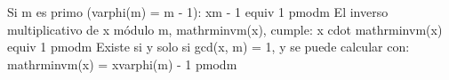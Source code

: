 {}Si \markdownRendererDollarSign{}m\markdownRendererDollarSign{} es primo (\markdownRendererDollarSign{}\markdownRendererBackslash{}varphi(m) = m - 1\markdownRendererDollarSign{}):\markdownRendererInterblockSeparator
{}
\markdownRendererSectionEnd \markdownRendererSectionBegin
{}\markdownRendererInterblockSeparator
{}\markdownRendererDollarSign{}\markdownRendererDollarSign{}\markdownRendererSoftLineBreak
{}x\markdownRendererCircumflex{}\markdownRendererLeftBrace{}m - 1\markdownRendererRightBrace{} \markdownRendererBackslash{}equiv 1 \markdownRendererBackslash{}pmod\markdownRendererLeftBrace{}m\markdownRendererRightBrace{}\markdownRendererSoftLineBreak
{}\markdownRendererDollarSign{}\markdownRendererDollarSign{}\markdownRendererParagraphSeparator
{}
\markdownRendererSectionEnd 
\markdownRendererSectionEnd \markdownRendererSectionBegin
{}\markdownRendererInterblockSeparator
{}El inverso multiplicativo de \markdownRendererDollarSign{}x\markdownRendererDollarSign{} módulo \markdownRendererDollarSign{}m\markdownRendererDollarSign{}, \markdownRendererDollarSign{}\markdownRendererBackslash{}mathrm\markdownRendererLeftBrace{}inv\markdownRendererRightBrace{}\markdownRendererUnderscore{}m(x)\markdownRendererDollarSign{}, cumple:\markdownRendererParagraphSeparator
{}\markdownRendererDollarSign{}\markdownRendererDollarSign{}\markdownRendererSoftLineBreak
{}x \markdownRendererBackslash{}cdot \markdownRendererBackslash{}mathrm\markdownRendererLeftBrace{}inv\markdownRendererRightBrace{}\markdownRendererUnderscore{}m(x) \markdownRendererBackslash{}equiv 1 \markdownRendererBackslash{}pmod\markdownRendererLeftBrace{}m\markdownRendererRightBrace{}\markdownRendererSoftLineBreak
{}\markdownRendererDollarSign{}\markdownRendererDollarSign{}\markdownRendererParagraphSeparator
{}Existe si y solo si \markdownRendererDollarSign{}\markdownRendererBackslash{}gcd(x, m) = 1\markdownRendererDollarSign{}, y se puede calcular con:\markdownRendererParagraphSeparator
{}\markdownRendererDollarSign{}\markdownRendererDollarSign{}\markdownRendererSoftLineBreak
{}\markdownRendererBackslash{}mathrm\markdownRendererLeftBrace{}inv\markdownRendererRightBrace{}\markdownRendererUnderscore{}m(x) = x\markdownRendererCircumflex{}\markdownRendererLeftBrace{}\markdownRendererBackslash{}varphi(m) - 1\markdownRendererRightBrace{} \markdownRendererBackslash{}pmod\markdownRendererLeftBrace{}m\markdownRendererRightBrace{}\markdownRendererSoftLineBreak
{}\markdownRendererDollarSign{}\markdownRendererDollarSign{}\markdownRendererParagraphSeparator
